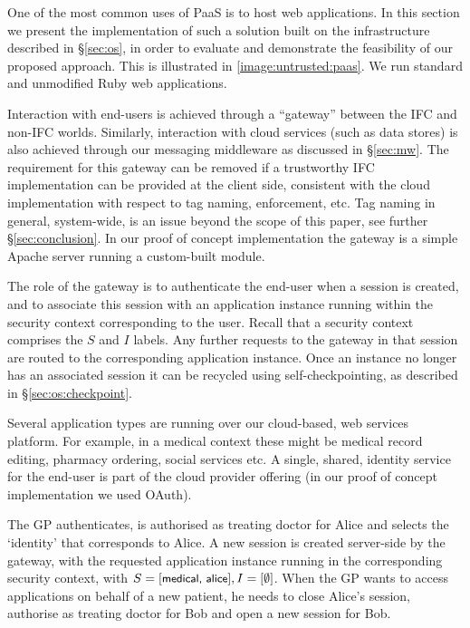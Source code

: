 \documentclass[10pt,journal,compsoc]{IEEEtran}
\begin{document}
One of the most common uses of PaaS is to host web applications.
In this section we present the implementation of such a solution built on the infrastructure described in \S\ref{sec:os}, in order to evaluate and demonstrate the feasibility of our proposed approach. 
This is illustrated in  \fig \ref{image:untrusted:paas}.
We run standard and unmodified Ruby web applications.





Interaction with end-users
is achieved through a ``gateway'' between the IFC and non-IFC worlds.
Similarly, interaction with cloud services (such as data stores) is also achieved through our messaging middleware as discussed in \S\ref{sec:mw}. 
The requirement for this gateway can be removed if a trustworthy IFC implementation can be provided at the client side, consistent with the cloud implementation with respect to tag naming, enforcement, etc. 
Tag naming in general, system-wide, is an issue beyond the scope of this paper, see further \S\ref{sec:conclusion}. In our proof of concept implementation the gateway is a simple Apache server running a custom-built module.



The role of the gateway is to authenticate the end-user when a session is created, and to associate this session with an application instance running within the security context corresponding to the user. Recall that a security context comprises the $S$ and $I$ labels. Any further requests to the gateway in that session are routed to the corresponding application instance. Once an instance no longer has an associated session it can be recycled using self-checkpointing, as described in \S\ref{sec:os:checkpoint}.



Several application types are running over our cloud-based, web services platform. For example, in a medical context these might be medical record editing, pharmacy ordering, social services etc.
A single, shared, identity service for the end-user is part of the cloud provider offering (in our proof of concept implementation we used OAuth\cite{hardt2012oauth}).


The GP authenticates, is authorised as treating doctor for Alice and selects the `identity' that corresponds to Alice. A new session is created server-side by the gateway, 
with the requested application instance running in the corresponding security context, 
with $S=[\textsf{\small medical, alice}], I=[\emptyset]$.
When the GP wants to access applications on behalf of a new patient, he needs to close Alice's session, authorise as treating doctor for Bob and open a new session for Bob. 
\end{document}
